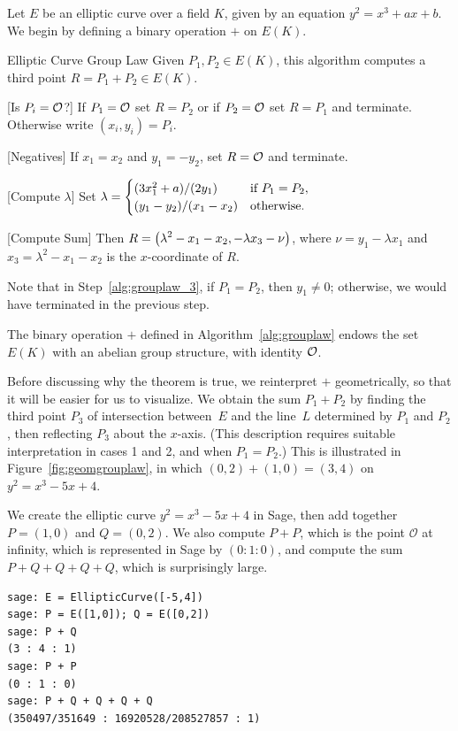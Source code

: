 Let $E$ be an elliptic curve over a field  $K$,
given by an equation $y^2=x^3+ax+b$.
We begin by defining a binary operation $+$ on $E(K)$.
\begin{algorithm}{Elliptic Curve Group Law}\label{alg:grouplaw}
Given $P_1, P_2\in E(K)$,
this algorithm computes a third point $R=P_1+P_2 \in E(K)$.
\begin{steps}
\item{}[Is $P_i=\mathcal{O}$?] If $P_1=\mathcal{O}$ set $R=P_2$ or if $P_2=\mathcal{O}$ set $R=P_1$
and terminate.  Otherwise write $(x_i,y_i)=P_i$.
\item{}[Negatives]  If $x_1 = x_2$ and $y_1 = -y_2$, set $R=\mathcal{O}$ and terminate.
\item{}[Compute $\lambda$]\label{alg:grouplaw_3}
Set $\displaystyle \lambda = \begin{cases}
 (3x_1^2+a)/(2y_1) & \text{if }P_1 = P_2,\\
(y_1-y_2)/(x_1-x_2) & \text{otherwise.}
\end{cases}$\\
\item{}[Compute Sum]\label{alg:grouplaw_4}  Then
$R = \displaystyle \left(\lambda^2 -x_1 - x_2, -\lambda x_3 - \nu\right)$,
where $\nu = y_1 - \lambda x_1$ and  $x_3=\lambda^2 -x_1 - x_2$
is the $x$-coordinate of $R$.
\end{steps}
\end{algorithm}
Note that in Step~\ref{alg:grouplaw_3}, if $P_1=P_2$, then $y_1\neq 0$;
otherwise, we would have terminated in the previous step.

\begin{theorem}\label{thm:grouplaw}
  The binary operation $+$ defined in Algorithm~\ref{alg:grouplaw}
  endows the set $E(K)$ with an abelian group structure, with identity $\mathcal{O}$.
\end{theorem}

Before discussing why the theorem is true, we reinterpret $+$
geometrically, so that it will be easier for us to visualize.
We obtain the
sum $P_1+P_2$  by finding the third point $P_3$ of
intersection between~$E$ and the line~$L$ determined by $P_1$ and
$P_2$, then reflecting $P_3$ about the $x$-axis.
(This description requires suitable interpretation in
cases 1 and 2, and when $P_1=P_2$.) This is illustrated
in Figure~\ref{fig:geomgrouplaw}, in which $(0,2)+(1,0) = (3,4)$ on
$y^2=x^3-5x+4$.

\begin{sg}
We create the elliptic curve $y^2=x^3 - 5x + 4$ in Sage,
then add together $P=(1,0)$ and $Q=(0,2)$.   We also
compute $P + P$, which is the point $\mathcal{O}$ at infinity, which
is represented in Sage by $(0:1:0)$, and compute the sum
$P + Q + Q + Q + Q$, which is surprisingly large.
\begin{verbatim}
sage: E = EllipticCurve([-5,4])
sage: P = E([1,0]); Q = E([0,2])
sage: P + Q
(3 : 4 : 1)
sage: P + P
(0 : 1 : 0)
sage: P + Q + Q + Q + Q
(350497/351649 : 16920528/208527857 : 1)
\end{verbatim}
\end{sg}

